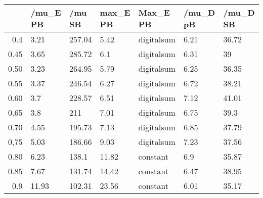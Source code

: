 \begin{table}[ht]
\centering
\begin{tabular}{rllllll}
  \hline
 & /mu\_E PB & /mu SB & max\_E PB & Max\_E PB & /mu\_D pB & /mu\_D SB \\ 
  \hline
0.4 & 3.21 & 257.04 & 5.42 & digitalsum & 6.21 & 36.72 \\ 
  0.45 & 3.65 & 285.72 & 6.1 & digitalsum & 6.31 & 39 \\ 
  0.50 & 3.23 & 264.95 & 5.79 & digitalsum & 6.25 & 36.35 \\ 
  0.55 & 3.37 & 246.54 & 6.27 & digitalsum & 6.72 & 38.21 \\ 
  0.60 & 3.7 & 228.57 & 6.51 & digitalsum & 7.12 & 41.01 \\ 
  0.65 & 3.8 & 211 & 7.01 & digitalsum & 6.75 & 39.3 \\ 
  0.70 & 4.55 & 195.73 & 7.13 & digitalsum & 6.85 & 37.79 \\ 
  0,75 & 5.03 & 186.66 & 9.03 & digitalsum & 7.23 & 37.56 \\ 
  0.80 & 6.23 & 138.1 & 11.82 & constant & 6.9 & 35.87 \\ 
  0.85 & 7.67 & 131.74 & 14.42 & constant & 6.47 & 38.95 \\ 
  0.9 & 11.93 & 102.31 & 23.56 & constant & 6.01 & 35.17 \\ 
   \hline
\end{tabular}
\end{table}
